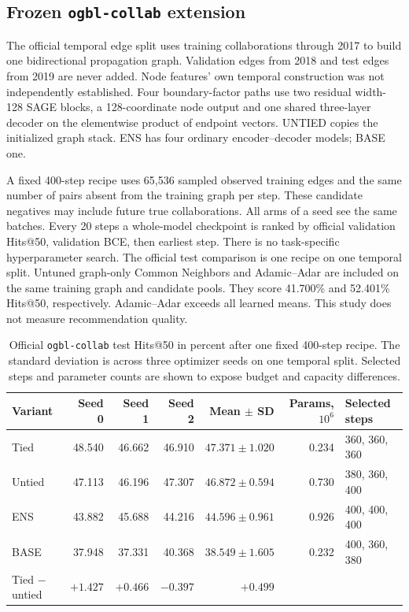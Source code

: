 \subsection{Frozen \texttt{ogbl-collab} extension}\label{app:collab}
The official temporal edge split uses training collaborations through
2017 to build one bidirectional propagation graph. Validation edges
from 2018 and test edges from 2019 are never added. Node features'
own temporal construction was not independently established. Four
boundary-factor paths use two residual width-128 SAGE blocks, a
128-coordinate node output and one shared three-layer decoder on the
elementwise product of endpoint vectors. UNTIED copies the initialized
graph stack. ENS has four ordinary encoder--decoder models; BASE one.

A fixed 400-step recipe uses 65,536 sampled observed training edges
and the same number of pairs absent from the training graph per step.
These candidate negatives may include future true collaborations.
All arms of a seed see the same batches. Every 20 steps a whole-model
checkpoint is ranked by official validation Hits@50, validation BCE,
then earliest step. There is no task-specific hyperparameter search.
The official test comparison is one recipe on one temporal split.
Untuned graph-only Common Neighbors and Adamic--Adar are included on
the same training graph and candidate pools. They score 41.700\% and
52.401\% Hits@50, respectively. Adamic--Adar exceeds all learned means. This study does not measure
recommendation quality.

\begin{table}[h]
\centering
\caption{Official \texttt{ogbl-collab} test Hits@50 in percent after one fixed 400-step recipe. The standard deviation is across three optimizer seeds on one temporal split. Selected steps and parameter counts are shown to expose budget and capacity differences.}
\label{tab:collab-hits}
\setlength{\tabcolsep}{4pt}
\small
\begin{tabular}{lrrrrrl}
\toprule
Variant & Seed 0 & Seed 1 & Seed 2 & Mean $\pm$ SD & Params, $10^6$ & Selected steps\\
\midrule
Tied & 48.540 & 46.662 & 46.910 & $47.371\pm1.020$ & 0.234 & 360, 360, 360\\
Untied & 47.113 & 46.196 & 47.307 & $46.872\pm0.594$ & 0.730 & 380, 360, 400\\
ENS & 43.882 & 45.688 & 44.216 & $44.596\pm0.961$ & 0.926 & 400, 400, 400\\
BASE & 37.948 & 37.331 & 40.368 & $38.549\pm1.605$ & 0.232 & 400, 360, 380\\
\midrule
Tied $-$ untied & $+1.427$ & $+0.466$ & $-0.397$ & $+0.499$ & & \\
\bottomrule
\end{tabular}
\end{table}

